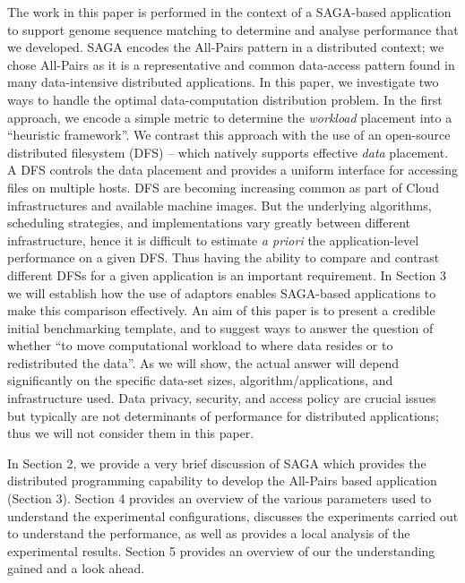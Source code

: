 \documentclass{rspublic}
\begin{document}
The work in this paper is performed in the context of a SAGA-based
application to support genome sequence matching to determine and
analyse performance that we developed. SAGA encodes the All-Pairs
pattern in a distributed context; we chose All-Pairs as it is a
representative and common data-access pattern found in many
data-intensive distributed applications.  In this paper, we
investigate two ways to handle the optimal data-computation distribution
problem.  In the first approach, we encode a simple metric to determine
the {\it workload} placement into a ``heuristic framework''. We contrast
this approach with the use of an open-source distributed filesystem
(DFS) -- which natively supports effective {\it data} placement.  A DFS
controls the data placement and provides a uniform interface for
accessing files on multiple hosts. DFS are becoming increasing common as
part of Cloud infrastructures and available machine images. But the
underlying algorithms, scheduling strategies, and implementations vary
greatly between different infrastructure, hence it is difficult to
estimate {\it a priori} the application-level performance on a given
DFS.  Thus having the ability to compare and contrast different DFSs for
a given application is an important requirement. In Section 3 we will
establish how the use of adaptors enables SAGA-based applications to
make this comparison effectively.  An aim of this paper is to present a
credible initial benchmarking template, and to suggest ways to answer
the question of whether ``to move computational workload to where data
resides or to redistributed the data''.  As we will show, the actual
answer will depend significantly on the specific data-set sizes,
algorithm/applications, and infrastructure used.  Data privacy,
security, and access policy are crucial issues but typically are not
determinants of performance for distributed applications; thus we will
not consider them in this paper.

In Section 2, we provide a very brief discussion of SAGA which
provides the distributed programming capability to develop the
All-Pairs based application (Section 3). Section 4 provides an
overview of the various parameters used to understand the experimental
configurations, discusses the experiments carried out to understand
the performance, as well as provides a local analysis of the
experimental results. Section 5 provides an overview of our the
understanding gained and a look ahead.

\end{document}
